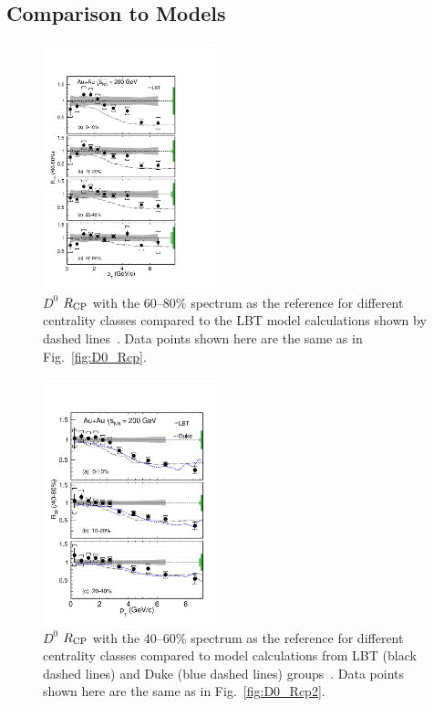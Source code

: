 \documentclass[%
 reprint,	
 amsmath,amssymb,
 aps,
 prc,
]{revtex4-1}
\begin{document}



\subsection{Comparison to Models}
\label{result:theory}

\begin{figure}
\centering
\includegraphics[width=0.45\textwidth]{fig/D0_Rcp11.pdf}
\caption{$D^{0}$ $R_{\rm CP}$ with the 60--80\% spectrum as the reference for different centrality classes compared to the LBT model calculations shown by dashed lines~\cite{Cao:2016gvr,LBT:private}. Data points shown here are the same as in Fig.~\ref{fig:D0_Rcp}.}
\label{fig:D0_Rcp11} 
\end{figure}

\begin{figure}
\centering
\includegraphics[width=0.45\textwidth]{fig/D0_Rcp22.pdf}
  \caption{$D^{0}$ $R_{\rm CP}$ with the 40--60\% spectrum as the reference for different centrality classes compared to model calculations from LBT (black dashed lines) and Duke (blue dashed lines) groups~\cite{Cao:2016gvr,LBT:private,Xu:2017obm}. Data points shown here are the same as in Fig.~\ref{fig:D0_Rcp2}.}
\label{fig:D0_Rcp22} 
\end{figure}
\end{document}
